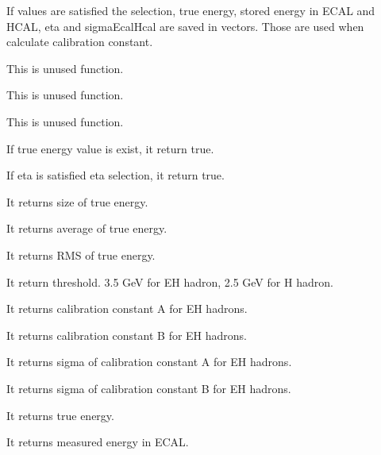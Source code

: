 \documentclass{cernrep}
\begin{document}

If values are satisfied the selection, true energy, stored energy in ECAL and HCAL, eta and sigmaEcalHcal are saved in vectors. Those are used when calculate calibration constant.


This is unused function.


This is unused function.


This is unused function.


If true energy value is exist, it return true.


If eta is satisfied eta selection, it return true.


It returns size of true energy.


It returns average of true energy.


It returns RMS of true energy.


It return threshold. 3.5 GeV for EH hadron, 2.5 GeV for H hadron.


It returns calibration constant A for EH hadrons.


It returns calibration constant B for EH hadrons.


It returns sigma of calibration constant A for EH hadrons.


It returns sigma of calibration constant B for EH hadrons.


It returns true energy.


It returns measured energy in ECAL.

\end{document}
